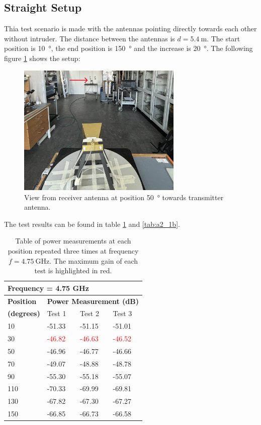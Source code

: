 \subsection{Straight Setup}
Thia test scenario is made with the antennas pointing directly towards each other without intruder. The distance between the antennas is $d=\SI{5.4}{\meter}$. The start position is \SI{10}{\degree}, the end position is \SI{150}{\degree} and the increase is \SI{20}{\degree}. The following figure \ref{fig:a2_1} shows the setup:
\begin{figure}[H]
    \centering
    \includegraphics[width=0.7\textwidth]{figures/test_los_straight.JPG}
    \caption{View from receiver antenna at position \SI{50}{\degree} towards transmitter antenna.} \label{fig:a2_1}
\end{figure}

The test results can be found in table \ref{tab:a2_1a} and \ref{tab:a2_1b}.
\begin{table}[H]
    \centering
    \begin{tabular}{l|l|l|l}
        \multicolumn{4}{l}{\textbf{Frequency = 4.75 GHz}}         \\
        \hline
        \textbf{Position} & \multicolumn{3}{l}{\textbf{Power Measurement (dB)}} \\
        \textbf{(degrees)}  & Test 1    & Test 2  & Test 3  \\
        \hline
        \hline
        10      & -51.33    & -51.15    & -51.01 \\
        30      & \textcolor{red}{-46.82}    & \textcolor{red}{-46.63}    & \textcolor{red}{-46.52} \\
        50      & -46.96    & -46.77    & -46.66 \\
        70      & -49.07    & -48.88    & -48.78 \\
        90      & -55.30    & -55.18    & -55.07 \\
        110     & -70.33    & -69.99    & -69.81 \\
        130     & -67.82    & -67.30    & -67.27 \\
        150     & -66.85    & -66.73    & -66.58
        \end{tabular}
    \caption{Table of power measurements at each position repeated three times at frequency $f=\SI{4.75}{\giga\hertz}$. The maximum gain of each test is highlighted in red.}
    \label{tab:a2_1a}
\end{table}

